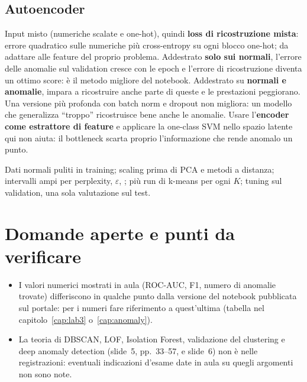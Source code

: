 \subsection{Autoencoder}
Input misto (numeriche scalate e one-hot), quindi \textbf{loss di ricostruzione mista}: errore quadratico
sulle numeriche più cross-entropy su ogni blocco one-hot; da adattare alle feature del proprio problema.
Addestrato \textbf{solo sui normali}, l'errore delle anomalie sul validation cresce con le epoch e
l'errore di ricostruzione diventa un ottimo score: è il metodo migliore del notebook. Addestrato su
\textbf{normali e anomalie}, impara a ricostruire anche parte di queste e le prestazioni peggiorano. Una
versione più profonda con batch norm e dropout non migliora: un modello che generalizza ``troppo''
ricostruisce bene anche le anomalie. Usare l'\textbf{encoder come estrattore di feature} e applicare la
one-class SVM nello spazio latente qui non aiuta: il bottleneck scarta proprio l'informazione che rende
anomalo un punto.

\begin{sintesi}
Dati normali puliti in training; scaling prima di PCA e metodi a distanza; intervalli ampi per
perplexity, $\varepsilon$, ; più run di k-means per ogni $K$; tuning sul validation,
una sola valutazione sul test.
\end{sintesi}

\section{Domande aperte e punti da verificare}
\begin{verifica}
\begin{itemize}
  \item I valori numerici mostrati in aula (ROC-AUC, F1, numero di anomalie trovate) differiscono in
    qualche punto dalla versione del notebook pubblicata sul portale: per i numeri fare riferimento a
    quest'ultima (tabella nel capitolo~\ref{cap:lab3} o~\ref{cap:anomaly}).
  \item La teoria di DBSCAN, LOF, Isolation Forest, validazione del clustering e deep anomaly detection
    (slide~5, pp.~33--57, e slide~6) non è nelle registrazioni: eventuali indicazioni d'esame date in aula
    su quegli argomenti non sono note.
\end{itemize}
\end{verifica}
